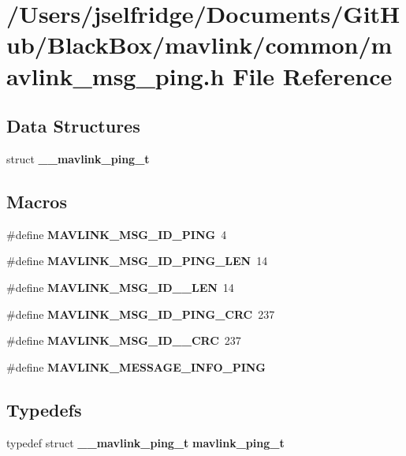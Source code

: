 \section{/\+Users/jselfridge/\+Documents/\+Git\+Hub/\+Black\+Box/mavlink/common/mavlink\+\_\+msg\+\_\+ping.h File Reference}
\label{mavlink__msg__ping_8h}
\subsection*{Data Structures}
\begin{DoxyCompactItemize}
\item 
struct \textbf{ \+\_\+\+\_\+mavlink\+\_\+ping\+\_\+t}
\end{DoxyCompactItemize}
\subsection*{Macros}
\begin{DoxyCompactItemize}
\item 
\#define \textbf{ M\+A\+V\+L\+I\+N\+K\+\_\+\+M\+S\+G\+\_\+\+I\+D\+\_\+\+P\+I\+NG}~4
\item 
\#define \textbf{ M\+A\+V\+L\+I\+N\+K\+\_\+\+M\+S\+G\+\_\+\+I\+D\+\_\+\+P\+I\+N\+G\+\_\+\+L\+EN}~14
\item 
\#define \textbf{ M\+A\+V\+L\+I\+N\+K\+\_\+\+M\+S\+G\+\_\+\+I\+D\+\_\+\_\+\+L\+EN}~14
\item 
\#define \textbf{ M\+A\+V\+L\+I\+N\+K\+\_\+\+M\+S\+G\+\_\+\+I\+D\+\_\+\+P\+I\+N\+G\+\_\+\+C\+RC}~237
\item 
\#define \textbf{ M\+A\+V\+L\+I\+N\+K\+\_\+\+M\+S\+G\+\_\+\+I\+D\+\_\+\_\+\+C\+RC}~237
\item 
\#define \textbf{ M\+A\+V\+L\+I\+N\+K\+\_\+\+M\+E\+S\+S\+A\+G\+E\+\_\+\+I\+N\+F\+O\+\_\+\+P\+I\+NG}
\end{DoxyCompactItemize}
\subsection*{Typedefs}
\begin{DoxyCompactItemize}
\item 
typedef struct \textbf{ \+\_\+\+\_\+mavlink\+\_\+ping\+\_\+t} \textbf{ mavlink\+\_\+ping\+\_\+t}
\end{DoxyCompactItemize}


